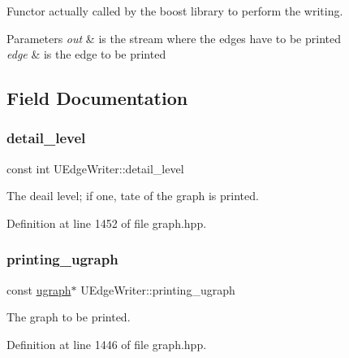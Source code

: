 Functor actually called by the boost library to perform the writing. 


\begin{DoxyParams}{Parameters}
{\em out} & is the stream where the edges have to be printed \\
\hline
{\em edge} & is the edge to be printed \\
\hline
\end{DoxyParams}


\subsection{Field Documentation}
\mbox{\label{classUEdgeWriter_a9fc4820dfb29beead02b831d1210119e}} 
\subsubsection{\texorpdfstring{detail\+\_\+level}{detail\_level}}
{\footnotesize\ttfamily const int U\+Edge\+Writer\+::detail\+\_\+level\hspace{0.3cm}{\ttfamily [protected]}}



The deail level; if one, tate of the graph is printed. 



Definition at line 1452 of file graph.\+hpp.

\mbox{\label{classUEdgeWriter_af3bc21358e854da6c8209300005500ed}} 
\subsubsection{\texorpdfstring{printing\+\_\+ugraph}{printing\_ugraph}}
{\footnotesize\ttfamily const \hyperlink{structugraph}{ugraph}$\ast$ U\+Edge\+Writer\+::printing\+\_\+ugraph\hspace{0.3cm}{\ttfamily [protected]}}



The graph to be printed. 



Definition at line 1446 of file graph.\+hpp.

